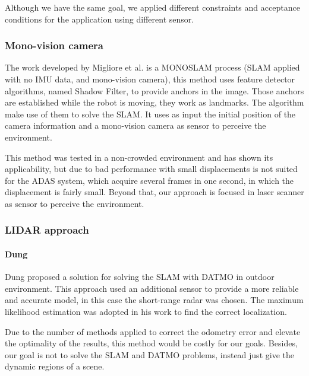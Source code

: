 Although we have the same goal, we applied different constraints and acceptance conditions for the application using different sensor. 

\subsubsection{Mono-vision camera}

The work developed by Migliore et al. \cite{Migliore_2009_ICRA} is a MONOSLAM process (SLAM applied with no IMU data, and mono-vision camera), this method uses feature detector algorithms, named Shadow Filter, to provide anchors in the image. Those anchors are established while the robot is moving, they work as landmarks. The algorithm make use of them to solve the SLAM. It uses as input the initial position of the camera information and a mono-vision camera as sensor to perceive the environment. %

This method was tested in a non-crowded environment and has shown its applicability, but due to bad performance with small displacements is not suited for the ADAS system, which acquire several frames in one second, in which the displacement is fairly small. Beyond that, our approach is focused in laser scanner as sensor to perceive the environment.

\subsubsection{LIDAR approach}

\paragraph*{Dung}

Dung \cite{DBLP:journals/inffus/VuBA11} proposed a solution for solving the SLAM with DATMO in outdoor environment. This approach used an additional sensor to provide a more reliable and accurate model, in this case the short-range radar was chosen. The maximum likelihood estimation was adopted in his work to find the correct localization. 

Due to the number of methods applied to correct the odometry error and elevate the optimality of the results, this method would be costly for our goals. Besides, our goal is not to solve the SLAM and DATMO problems, instead just give the dynamic regions of a scene.

